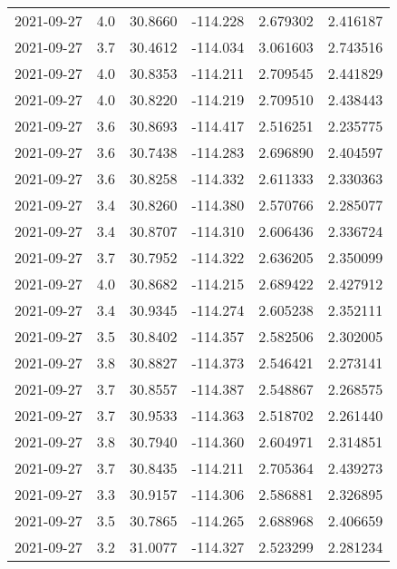 \begin{tabular}{lrrrrr}
2021-09-27 &       4.0 &  30.8660 &  -114.228 &         2.679302 &         2.416187 \\
2021-09-27 &       3.7 &  30.4612 &  -114.034 &         3.061603 &         2.743516 \\
2021-09-27 &       4.0 &  30.8353 &  -114.211 &         2.709545 &         2.441829 \\
2021-09-27 &       4.0 &  30.8220 &  -114.219 &         2.709510 &         2.438443 \\
2021-09-27 &       3.6 &  30.8693 &  -114.417 &         2.516251 &         2.235775 \\
2021-09-27 &       3.6 &  30.7438 &  -114.283 &         2.696890 &         2.404597 \\
2021-09-27 &       3.6 &  30.8258 &  -114.332 &         2.611333 &         2.330363 \\
2021-09-27 &       3.4 &  30.8260 &  -114.380 &         2.570766 &         2.285077 \\
2021-09-27 &       3.4 &  30.8707 &  -114.310 &         2.606436 &         2.336724 \\
2021-09-27 &       3.7 &  30.7952 &  -114.322 &         2.636205 &         2.350099 \\
2021-09-27 &       4.0 &  30.8682 &  -114.215 &         2.689422 &         2.427912 \\
2021-09-27 &       3.4 &  30.9345 &  -114.274 &         2.605238 &         2.352111 \\
2021-09-27 &       3.5 &  30.8402 &  -114.357 &         2.582506 &         2.302005 \\
2021-09-27 &       3.8 &  30.8827 &  -114.373 &         2.546421 &         2.273141 \\
2021-09-27 &       3.7 &  30.8557 &  -114.387 &         2.548867 &         2.268575 \\
2021-09-27 &       3.7 &  30.9533 &  -114.363 &         2.518702 &         2.261440 \\
2021-09-27 &       3.8 &  30.7940 &  -114.360 &         2.604971 &         2.314851 \\
2021-09-27 &       3.7 &  30.8435 &  -114.211 &         2.705364 &         2.439273 \\
2021-09-27 &       3.3 &  30.9157 &  -114.306 &         2.586881 &         2.326895 \\
2021-09-27 &       3.5 &  30.7865 &  -114.265 &         2.688968 &         2.406659 \\
2021-09-27 &       3.2 &  31.0077 &  -114.327 &         2.523299 &         2.281234 \\

\end{tabular}
